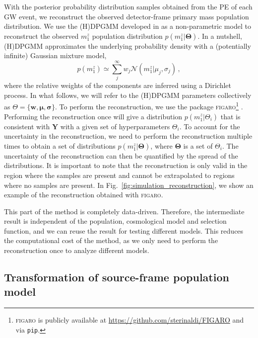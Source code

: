 \documentclass[sn-aps, pdflatex, iicol]{sn-jnl}
\begin{document}
With the posterior probability distribution samples obtained from the \ac{PE} of each \ac{GW} event, we reconstruct the observed detector-frame primary mass population distribution.
We use the \ac{(H)DPGMM} developed in \cite{Rinaldi:2021bhm} as a non-parametric model to reconstruct the observed $m^z_1$ population distribution $p(m^z_1|\mathbf{\Theta})$.
In a nutshell, (H)DPGMM approximates the underlying probability density with a (potentially infinite) Gaussian mixture model,
\begin{equation}
    p(m_1^z) \simeq \sum_j^\infty w_j \mathcal{N}(m_1^z|\mu_j,\sigma_j)\,,
\end{equation}
where the relative weights of the components are inferred using a Dirichlet process.
In what follows, we will refer to the (H)DPGMM parameters collectively as $\Theta = \{\mathbf{w},\boldsymbol\mu,\boldsymbol\sigma\}$.
To perform the reconstruction, we use the package \textsc{figaro}\footnote{\textsc{figaro} is publicly available at \url{https://github.com/sterinaldi/FIGARO} and via \texttt{pip}.} \citep{Rinaldi:2024eep}.
Performing the reconstruction once will give a distribution $p(m^z_1|\Theta_i)$ that is consistent with $\mathbf{Y}$ with a given set of hyperparameters $\Theta_i$.
To account for the uncertainty in the reconstruction, we need to perform the reconstruction multiple times to obtain a set of distributions $p(m^z_1|\mathbf{\Theta})$, where $\mathbf{\Theta}$ is a set of $\Theta_i$.
The uncertainty of the reconstruction can then be quantified by the spread of the distributions.
It is important to note that the reconstruction is only valid in the region where the samples are present and cannot be extrapolated to regions where no samples are present.
In Fig.~\ref{fig:simulation_reconstruction}, we show an example of the reconstruction obtained with \textsc{figaro}.

This part of the method is completely data-driven.
Therefore, the intermediate result is independent of the population, cosmological model and selection function, and we can reuse the result for testing different models.
This reduces the computational cost of the method, as we only need to perform the reconstruction once to analyze different models.

\subsection{Transformation of source-frame population model}
\label{sec:transformation}
\end{document}
